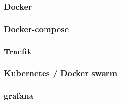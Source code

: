 \subsubsection{Docker} \label{subsubsec:Docker}
\subsubsection{Docker-compose}
\subsubsection{Traefik} \label{subsubsec:Traefik}
\subsubsection{Kubernetes / Docker swarm}
\subsubsection{grafana}

